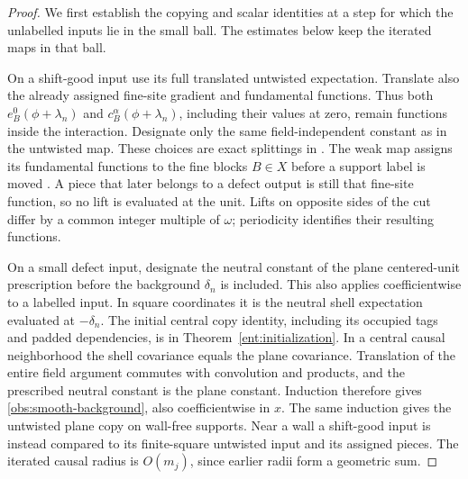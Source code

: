 \begin{proof}
We first establish the copying and scalar identities at a step for
which the unlabelled inputs lie in the small ball.  The estimates
below keep the iterated maps in that ball.

On a shift-good input use its full translated untwisted expectation.
Translate also the already assigned fine-site gradient and fundamental
functions.  Thus both \(e_B^0(\phi+\lambda_n)\) and
\(c_B^\alpha(\phi+\lambda_n)\), including their values at zero, remain
functions inside the interaction.  Designate only the same
field-independent constant as in the untwisted map.  These choices
are exact splittings in \cite[Proposition~4.8]{B}.  The weak map
assigns its fundamental functions to the fine blocks \(B\in X\)
before a support label is moved
\cite[Section~8.2, before Proposition~8.3]{B}.  A piece that later
belongs to a defect output is still that fine-site function, so no
lift is evaluated at the unit.  Lifts on opposite sides of the cut
differ by a common integer multiple of \(\omega\); periodicity
identifies their resulting functions.

On a small defect input, designate the neutral constant of the plane
centered-unit prescription before the background \(\delta_n\) is
included.  This also applies coefficientwise to a labelled input.
In square coordinates it is the neutral shell expectation evaluated
at \(-\delta_n\).  The initial central copy identity, including its
occupied tags and padded dependencies, is in
Theorem~\ref{ent:initialization}.  In a central causal neighborhood
the shell covariance equals the plane covariance.  Translation of
the entire field argument commutes with convolution and products,
and the prescribed neutral constant is the plane constant.  Induction
therefore gives \eqref{obs:smooth-background}, also coefficientwise
in \(x\).  The same induction gives the untwisted plane copy on
wall-free supports.  Near a wall a shift-good input is instead
compared to its finite-square untwisted input and its assigned pieces.
The iterated causal radius is \(O(m_j)\), since earlier radii form
a geometric sum.


\end{proof}
